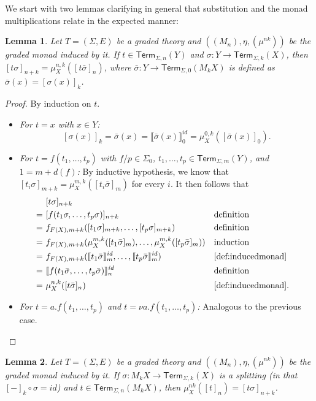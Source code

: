 \documentclass[11pt,a4paper]{amsart}
\newtheorem{lemma}[lemma]{Lemma}
\newcommand{\Term}{\mathsf{Term}}
\newcommand{\sig}{\Sigma}
\newcommand{\sigp}{\Sigma_0}
\theoremstyle{plain}
\newcommand{\id}{\mathit{id}}
\numberwithin{equation}{section}
\newcommand{\+}[1]{\mathcal{#1}\xspace}
\theoremstyle{definition}
\begin{document}
We start with two lemmas clarifying in general that substitution and the monad multiplications relate in the expected manner:
\begin{lemma}\label{thm:multiplicationsubstitution}
  Let \(T = (\sig, E)\) be a graded theory and
  \(((M_n), \eta, (\mu^{nk}))\) be the graded monad induced by it.  If
  \(t \in \Term_{\sig, n}(Y)\) and
  \(\sigma: Y \to \Term_{\sig, k}(X)\), then
  \([t\sigma]_{n + k} = \mu^{n, k}_X([t\bar{\sigma}]_n)\), where
  \(\bar{\sigma}: Y \to \Term_{\sig, 0}(M_k X)\) is defined as
  \(\bar{\sigma}(x) = [\sigma(x)]_k\).
\end{lemma}

\begin{proof}
    By induction on \(t\).
    \begin{itemize}
        \item
            \textit{For \(t = x\) with \(x \in Y\):}
            \[
                [\sigma(x)]_{k} = \bar{\sigma}(x) = \llbracket \bar{\sigma}(x) \rrbracket^\id_0 = \mu^{0, k}_X([\bar{\sigma}(x)]_0).
            \]
        \item
            \textit{For \(t = f(t_1, \ldots, t_p)\) with \(f/p \in \sigp\), \(t_1, \ldots, t_p \in \Term_{\sig, m}(Y)\), and \(1 = m + d(f)\):}
            By inductive hypothesis, we know that \([t_i\sigma]_{m + k} = \mu^{m, k}_X([t_i\bar{\sigma}]_m)\) for every \(i\).
            It then follows that
            \begin{align*}
                &[t\sigma]_{n + k} \\
                =~&[f(t_1\sigma, \ldots, t_p\sigma)]_{n + k} && \text{definition} \\
                =~&f_{F(X), m + k}([t_1\sigma]_{m + k}, \ldots, [t_p\sigma]_{m + k}) && \text{definition} \\
                =~&f_{F(X), m + k}(\mu^{m, k}_X([t_1\bar{\sigma}]_m), \ldots, \mu^{m, k}_X([t_p\bar{\sigma}]_m)) && \text{induction} \\
                =~&f_{F(X), m + k}(\llbracket t_1\bar{\sigma} \rrbracket^\id_m, \ldots, \llbracket t_p\bar{\sigma} \rrbracket^\id_m) && \text{\cref{def:inducedmonad}} \\
                =~&\llbracket f(t_1\bar{\sigma}, \ldots, t_p\bar{\sigma}) \rrbracket^\id_{n} && \text{definition} \\
                =~&\mu^{n, k}_X([t\bar{\sigma}]_n) && \text{\cref{def:inducedmonad}}.
            \end{align*}
        \item
            \textit{For \(t = a.f(t_1, \ldots, t_p)\) and \(t = \nu a.f(t_1, \ldots, t_p)\):}
            Analogous to the previous case.
    \end{itemize}

\end{proof}
\begin{lemma}\label{thm:multiplicationsplitting}
    Let \(T = (\sig, E)\) be a graded theory and \(((M_n), \eta, (\mu^{nk}))\) be the graded monad induced by it.
    If \(\sigma: M_k X \to \Term_{\sig, k}(X)\) is a splitting (in that \([-]_k \circ \sigma = \id\)) and \(t \in \Term_{\sig, n}(M_k X)\), then \(\mu^{nk}_X([t]_n) = [t\sigma]_{n + k}\).
\end{lemma}
\end{document}

